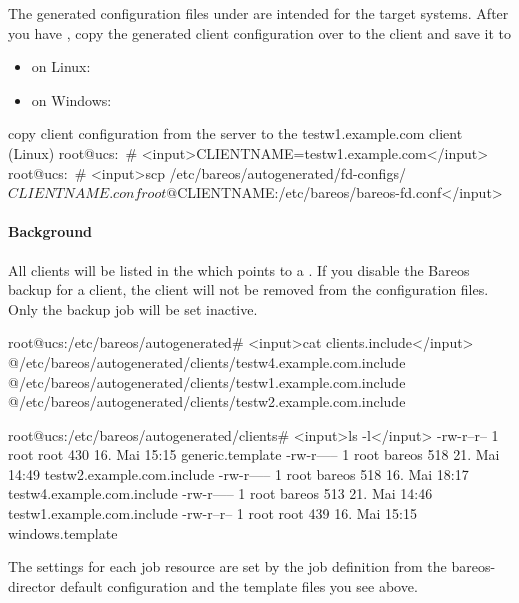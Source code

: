 The generated configuration files under  are intended for the target systems.
After you have ,
copy the generated client configuration over to the client and save it to 
\begin{itemize}
    \item on Linux: 
    \item on Windows: 
\end{itemize}

\begin{commands}{copy client configuration from the server to the testw1.example.com client (Linux)}
root@ucs:~# <input>CLIENTNAME=testw1.example.com</input>
root@ucs:~# <input>scp /etc/bareos/autogenerated/fd-configs/${CLIENTNAME}.conf root@${CLIENTNAME}:/etc/bareos/bareos-fd.conf</input>
\end{commands}


\paragraph{Background}

All clients will be listed in the  which points to a . If you disable the Bareos backup for a client, the client will not be removed from the configuration files. Only the backup job will be set inactive.

\begin{commands}{}
root@ucs:/etc/bareos/autogenerated# <input>cat clients.include</input>
@/etc/bareos/autogenerated/clients/testw4.example.com.include
@/etc/bareos/autogenerated/clients/testw1.example.com.include
@/etc/bareos/autogenerated/clients/testw2.example.com.include
\end{commands}

\begin{commands}{}
root@ucs:/etc/bareos/autogenerated/clients# <input>ls -l</input>
-rw-r--r-- 1 root root 430 16. Mai 15:15 generic.template
-rw-r----- 1 root bareos 518 21. Mai 14:49 testw2.example.com.include
-rw-r----- 1 root bareos 518 16. Mai 18:17 testw4.example.com.include
-rw-r----- 1 root bareos 513 21. Mai 14:46 testw1.example.com.include
-rw-r--r-- 1 root root 439 16. Mai 15:15 windows.template
\end{commands}

The settings for each job resource are set by the job definition from the bareos-director default configuration and the template files you see above.

